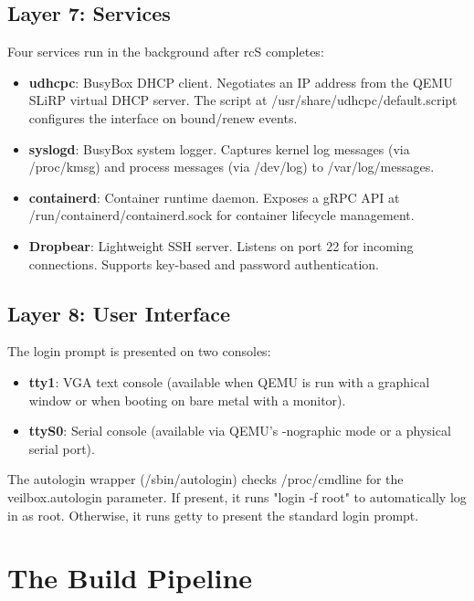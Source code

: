 \subsection{Layer 7: Services}

Four services run in the background after rcS completes:

\begin{itemize}[nosep]
  \item \textbf{udhcpc}: BusyBox DHCP client. Negotiates an IP address from
        the QEMU SLiRP virtual DHCP server. The script at
        /usr/share/udhcpc/default.script configures the interface on
        bound/renew events.
  \item \textbf{syslogd}: BusyBox system logger. Captures kernel log messages
        (via /proc/kmsg) and process messages (via /dev/log) to
        /var/log/messages.
  \item \textbf{containerd}: Container runtime daemon. Exposes a gRPC API at
        /run/containerd/containerd.sock for container lifecycle management.
  \item \textbf{Dropbear}: Lightweight SSH server. Listens on port 22 for
        incoming connections. Supports key-based and password authentication.
\end{itemize}

\subsection{Layer 8: User Interface}

The login prompt is presented on two consoles:
\begin{itemize}[nosep]
  \item \textbf{tty1}: VGA text console (available when QEMU is run with a
        graphical window or when booting on bare metal with a monitor).
  \item \textbf{ttyS0}: Serial console (available via QEMU's -nographic
        mode or a physical serial port).
\end{itemize}

The autologin wrapper (/sbin/autologin) checks /proc/cmdline for the
veilbox.autologin parameter. If present, it runs "login -f root" to
automatically log in as root. Otherwise, it runs getty to present the
standard login prompt.

\section{The Build Pipeline}


